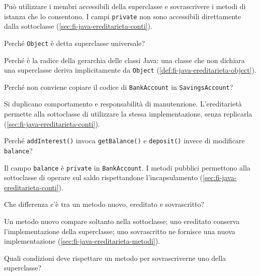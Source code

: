 Può utilizzare i membri accessibili della superclasse e sovrascrivere i
metodi di istanza che lo consentono. I campi \texttt{private} non sono
accessibili direttamente dalla sottoclasse
(\cref{sec:fi-java-ereditarieta-conti}).

\begin{exercise}
\label{ex:fi-esercizi-java-ereditarieta-object}
Perché \texttt{Object} è detta superclasse universale?
\end{exercise}

Perché è la radice della gerarchia delle classi Java: una classe che non
dichiara una superclasse deriva implicitamente da \texttt{Object}
(\cref{def:fi-java-ereditarieta-object}).

\begin{exercise}
\label{ex:fi-esercizi-java-ereditarieta-duplicazione}
Perché non conviene copiare il codice di \texttt{BankAccount} in
\texttt{SavingsAccount}?
\end{exercise}

Si duplicano comportamento e responsabilità di manutenzione. L’ereditarietà
permette alla sottoclasse di utilizzare la stessa implementazione, senza
replicarla (\cref{sec:fi-java-ereditarieta-conti}).

\begin{exercise}
\label{ex:fi-esercizi-java-ereditarieta-addinterest}
Perché \texttt{addInterest()} invoca \texttt{getBalance()} e
\texttt{deposit()} invece di modificare \texttt{balance}?
\end{exercise}

Il campo \texttt{balance} è \texttt{private} in \texttt{BankAccount}. I
metodi pubblici permettono alla sottoclasse di operare sul saldo
rispettandone l’incapsulamento (\cref{sec:fi-java-ereditarieta-conti}).

\begin{exercise}
\label{ex:fi-esercizi-java-ereditarieta-metodi-tipi}
Che differenza c’è tra un metodo nuovo, ereditato e sovrascritto?
\end{exercise}

Un metodo nuovo compare soltanto nella sottoclasse; uno ereditato conserva
l’implementazione della superclasse; uno sovrascritto ne fornisce una nuova
implementazione (\cref{sec:fi-java-ereditarieta-metodi}).

\begin{exercise}
\label{ex:fi-esercizi-java-ereditarieta-override-firma}
Quali condizioni deve rispettare un metodo per sovrascriverne uno della
superclasse?
\end{exercise}

